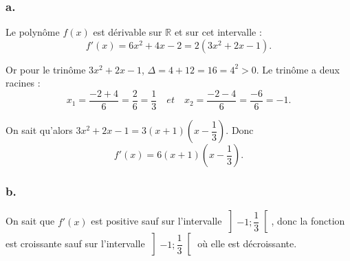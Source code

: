 \documentclass[10pt]{article}
\begin{document}
	\subsubsection*{a.}
	
	Le polynôme \(f(x)\) est dérivable sur \(\mathbb{R}\) et sur cet intervalle :
	\[
	f'(x) = 6x^2 + 4x - 2 = 2(3x^2 + 2x - 1).
	\]
	
	Or pour le trinôme \(3x^2 + 2x - 1\), \(\Delta = 4 + 12 = 16 = 4^2 > 0\). Le trinôme a deux racines :
	\[
	x_1 = \dfrac{-2 + 4}{6} = \dfrac{2}{6} = \dfrac{1}{3} \quad et \quad x_2 = \dfrac{-2 - 4}{6} = \dfrac{-6}{6} = -1.
	\]
	
	On sait qu’alors \(3x^2 + 2x - 1 = 3(x + 1)(x - \dfrac{1}{3})\). Donc
	\[
	f'(x) = 6(x + 1)(x - \dfrac{1}{3}).
	\]
	
	\subsubsection*{b.}
	
	On sait que \(f'(x)\) est positive sauf sur l’intervalle \(\left] -1 ; \dfrac{1}{3} \right[\), donc la fonction est croissante sauf sur l’intervalle \(\left] -1 ; \dfrac{1}{3} \right[\) où elle est décroissante.
\end{document}
